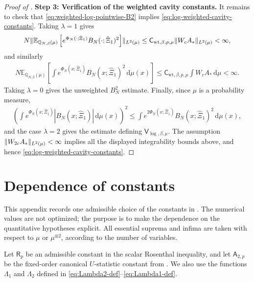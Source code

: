 \documentclass[11pt,reqno]{amsart}
\numberwithin{equation}{section}
\theoremstyle{plain}
\theoremstyle{remark}
\DeclarePairedDelimiter{\norm}{\lVert}{\rVert}
\newcommand{\md}{\mathrm{d}}
\newcommand{\E}{{\mathbb{E}}}
\newcommand{\Q}{{\mathbb{Q}}}
\newcommand{\be}{\beta}
\newcommand{\step}[1]{\par\medskip\noindent\textbf{#1}}
\begin{document}
\begin{proof}[Proof of ]
\step{Step 3: Verification of the weighted cavity constants.}
It remains to check that \eqref{eq:weighted-log-pointwise-B2} implies \eqref{eq:log-weighted-cavity-constants}.  Taking \(\lambda=1\) gives
\begin{align}\label{eq:weighted-log-E-bound}
 N\norm{\E_{\Q_{N,\be}(\mu)}\left[
 e^{\Phi_N(\cdot;\hat\Xi_1)}B_N(\cdot;\hat\Xi_1)^2\right]}_{L^2(\mu)}
 \le
 \mathsf C_{\mathrm{wt},\be,p,\mu}
 \norm{W_cA_*}_{L^2(\mu)}<\infty,
\end{align}
and similarly
\begin{align}\label{eq:weighted-log-D-bound}
 N\E_{\Q_{N,\be}(\mu)}\left[
 \int e^{\Phi_N(x;\hat\Xi_1)}
 B_N(x;\hat\Xi_1)^2\,\md\mu(x)\right]
 \le
 \mathsf C_{\mathrm{wt},\be,p,\mu}
 \int W_cA_*\,\md\mu<\infty.
\end{align}
Taking \(\lambda=0\) gives the unweighted \(B_N^2\) estimate.  Finally, since \(\mu\) is a probability measure,
\begin{align}\label{eq:weighted-log-V-cauchy}
 \left(\int e^{\Phi_N(x;\hat\Xi_1)}|B_N(x;\hat\Xi_1)|\,\md\mu(x)\right)^2
 \le
 \int e^{2\Phi_N(x;\hat\Xi_1)}B_N(x;\hat\Xi_1)^2\,\md\mu(x),
\end{align}
and the case \(\lambda=2\) gives the estimate defining \(\mathsf V_{\log,\be,\mu}\).  The assumption \(\norm{W_{2c}A_*}_{L^2(\mu)}<\infty\) implies all the displayed integrability bounds above, and hence \eqref{eq:log-weighted-cavity-constants}.
\end{proof}

\section{Dependence of constants}\label{app:dependence-constants}

This appendix records one admissible choice of the constants in .  The numerical values are not optimized; the purpose is to make the dependence on the quantitative hypotheses explicit.  All essential suprema and infima are taken with respect to \(\mu\) or \(\mu^{\otimes2}\), according to the number of variables.

Let \(\mathsf R_p\) be an admissible constant in the scalar Rosenthal inequality, and let \(\mathsf A_{2,p}\) be the fixed-order canonical \(U\)-statistic constant from .  We also use the functions \(\Lambda_1\) and \(\Lambda_2\) defined in \eqref{eq:Lambda2-def}--\eqref{eq:Lambda1-def}.
\end{document}

